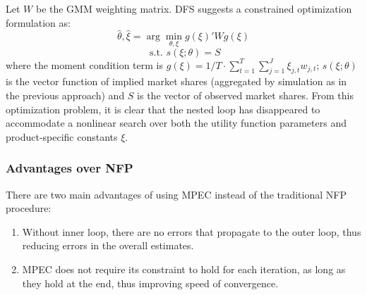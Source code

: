 Let $W$ be the GMM weighting matrix. DFS suggests a constrained optimization formulation as: $$\hat\theta, \hat\xi = \arg \min_{\theta, \xi} g(\xi)' W g(\xi) $$ $$ \text{ s.t. } s(\xi;\theta) = S $$ where the moment condition term is $g(\xi) = 1/T \cdot \sum_{t=1}^T \sum_{j=1}^J \xi_{j,t} w_{j,t}$; $s(\xi;\theta)$ is the vector function of implied market shares (aggregated by simulation as in the previous approach) and $S$ is the vector of observed market shares. From this optimization problem, it is clear that the nested loop has disappeared to accommodate a nonlinear search over both the utility function parameters and product-specific constants $\xi$.

\subsubsection{Advantages over NFP}

There are two main advantages of using MPEC instead of the traditional NFP procedure:\begin{enumerate}
\item Without inner loop, there are no errors that propagate to the outer loop, thus reducing errors in the overall estimates.
\item MPEC does not require its constraint to hold for each iteration, as long as they hold at the end, thus improving speed of convergence.
\end{enumerate}